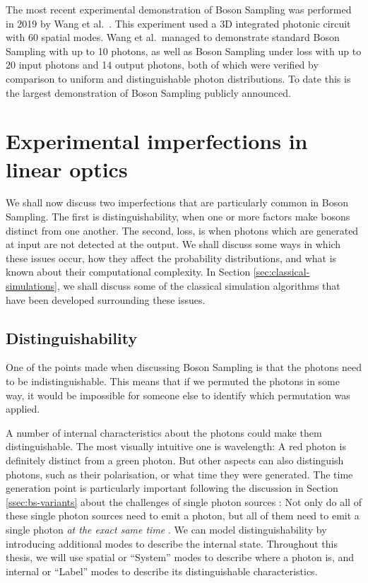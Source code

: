 The most recent experimental demonstration of Boson Sampling was performed in 2019 by Wang et al.~\cite{wang2019}. This experiment used a 3D integrated photonic circuit with 60 spatial modes. Wang et al.\ managed to demonstrate standard Boson Sampling with up to 10 photons, as well as Boson Sampling under loss with up to 20 input photons and 14 output photons, both of which were verified by comparison to uniform and distinguishable photon distributions. To date this is the largest demonstration of Boson Sampling publicly announced.

\section{Experimental imperfections in linear optics}
\label{sec:lo-imperfections}

We shall now discuss two imperfections that are particularly common in Boson Sampling. The first is distinguishability, when one or more factors make bosons distinct from one another. The second, loss, is when photons which are generated at input are not detected at the output. We shall discuss some ways in which these issues occur, how they affect the probability distributions, and what is known about their computational complexity. In Section \ref{sec:classical-simulations}, we shall discuss some of the classical simulation algorithms that have been developed surrounding these issues.

\subsection{Distinguishability}
\label{ssec:imperfections-distinguishability}

One of the points made when discussing Boson Sampling is that the photons need to be indistinguishable. This means that if we permuted the photons in some way, it would be impossible for someone else to identify which permutation was applied.

A number of internal characteristics about the photons could make them distinguishable. The most visually intuitive one is wavelength: A red photon is definitely distinct from a green photon. But other aspects can also distinguish photons, such as their polarisation, or what time they were generated. The time generation point is particularly important following the discussion in Section \ref{ssec:bs-variants} about the challenges of single photon sources \cite{eisaman2011}: Not only do all of these single photon sources need to emit a photon, but all of them need to emit a single photon \textit{at the exact same time} \cite{aaronson2010report}. We can model distinguishability by introducing additional modes to describe the internal state. Throughout this thesis, we will use spatial or ``System'' modes to describe where a photon is, and internal or ``Label'' modes to describe its distinguishable characteristics.

